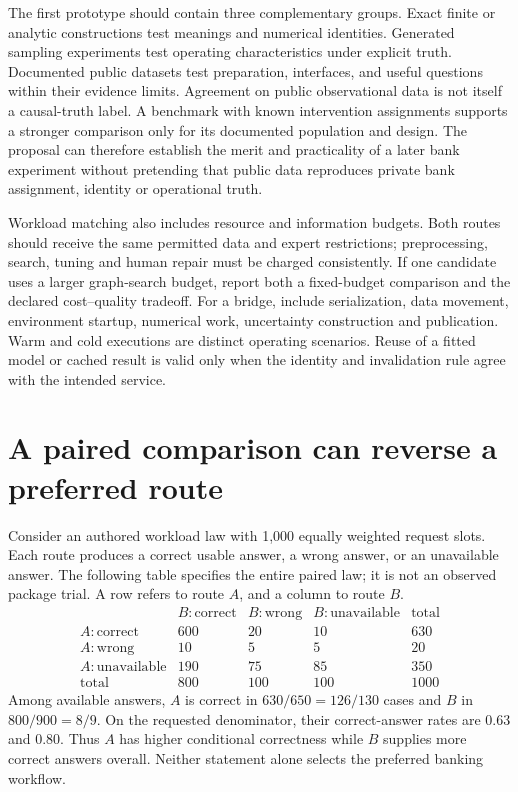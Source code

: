 The first prototype should contain three complementary groups. Exact finite
or analytic constructions test meanings and numerical identities. Generated
sampling experiments test operating characteristics under explicit truth.
Documented public datasets test preparation, interfaces, and useful questions
within their evidence limits. Agreement on public observational data is not
itself a causal-truth label. A benchmark with known intervention assignments
supports a stronger comparison only for its documented population and design.
The proposal can therefore establish the merit and practicality of a later
bank experiment without pretending that public data reproduces private bank
assignment, identity or operational truth.
\citep{exec16_s10_design}

Workload matching also includes resource and information budgets. Both routes
should receive the same permitted data and expert restrictions; preprocessing,
search, tuning and human repair must be charged consistently. If one candidate
uses a larger graph-search budget, report both a fixed-budget comparison and
the declared cost--quality tradeoff. For a bridge, include serialization, data
movement, environment startup, numerical work, uncertainty construction and
publication. Warm and cold executions are distinct operating scenarios. Reuse
of a fitted model or cached result is valid only when the identity and
invalidation rule agree with the intended service.

\section{A paired comparison can reverse a preferred route}

Consider an authored workload law with 1,000 equally weighted request slots.
Each route produces a correct usable answer, a wrong answer, or an unavailable
answer. The following table specifies the entire paired law; it is not an
observed package trial. A row refers to route \(A\), and a column to route
\(B\).
\[
\begin{array}{c|rrr|r}
 &B:\mathrm{correct}&B:\mathrm{wrong}&B:\mathrm{unavailable}&\mathrm{total}\\\hline
 A:\mathrm{correct}&600&20&10&630\\
 A:\mathrm{wrong}&10&5&5&20\\
 A:\mathrm{unavailable}&190&75&85&350\\\hline
 \mathrm{total}&800&100&100&1000
\end{array}
\]
Among available answers, \(A\) is correct in \(630/650=126/130\) cases and
\(B\) in \(800/900=8/9\). On the requested denominator, their correct-answer
rates are 0.63 and 0.80. Thus \(A\) has higher conditional correctness while
\(B\) supplies more correct answers overall. Neither statement alone selects
the preferred banking workflow.
\citep{exec16_s10_exact}

